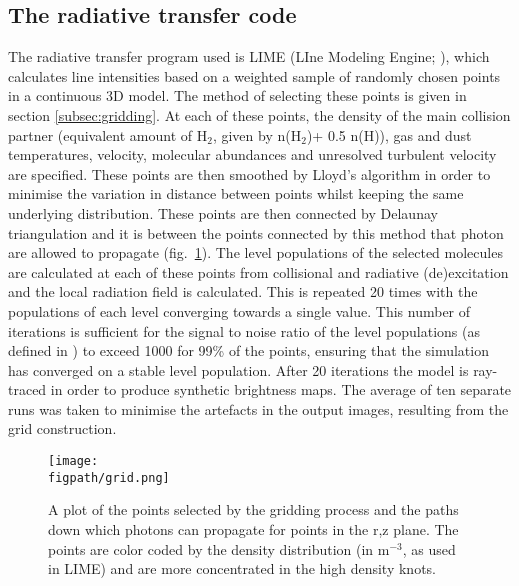 \documentclass[useAMS,usenatbib,letters]{mn2e}
\newcommand{\figpath}{PFIGS/}
\begin{document}
\subsection{The radiative transfer code} \label{subsec:radiative_transfer_code}
The radiative transfer program used is LIME (LIne Modeling Engine; \citealt{Brinch:2010p13078}), which  calculates line intensities based on a weighted sample of randomly chosen points in a continuous 3D model. The method of selecting these points is given in section \ref{subsec:gridding}. At each of these points, the density of the main collision partner (equivalent amount of H$_2$, given by n(H$_2$)+ 0.5 n(H)), gas and dust temperatures, velocity, molecular abundances and unresolved turbulent velocity are specified. These points are then smoothed by Lloyd's algorithm \citep{Lloyd1982} in order to minimise the variation in distance between points whilst keeping the same underlying distribution. These points are then connected by Delaunay triangulation and it is between the points connected by this method that photon are allowed to propagate (fig.~\ref{grid}). The level populations of the selected molecules are calculated at each of these points from collisional and radiative (de)excitation and the local radiation field is calculated. This is repeated 20 times with the populations of each level converging towards a single value. This number of iterations is sufficient for the signal to noise ratio of the level populations (as defined in \citealt{Brinch:2010p13078}) to exceed 1000 for 99\% of the points, ensuring that the simulation has converged on a stable level population. After 20 iterations the model is ray-traced in order to produce synthetic brightness maps. The average of ten separate runs was taken to minimise the artefacts in the output images, resulting from the grid construction.%


\begin{figure}
 \texttt{[image: \\figpath/grid.png]}
 \caption{A plot of the points selected by the gridding process and the paths down which photons can propagate for points in the r,z plane. The points are color coded by the density distribution (in m$^{-3}$, as used in LIME) and are more concentrated in the high density knots.}
\label{grid} %
\end{figure}
\end{document}
